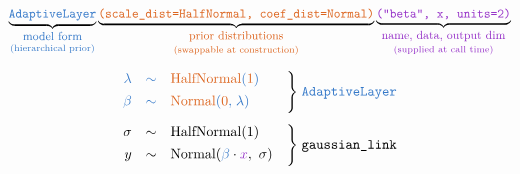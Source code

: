 \documentclass[11pt]{article}
\begin{document}
\[
  \underbrace{%
    \textcolor{modelcol}{\texttt{AdaptiveLayer}}%
  }_{\substack{\textcolor{modelcol}{\text{\small model form}}\\[2pt]
               \textcolor{modelcol}{\text{\scriptsize (hierarchical prior)}}}}
  \underbrace{%
    \textcolor{distcol}{%
      \texttt{(scale\_dist{=}HalfNormal,\ coef\_dist{=}Normal)}%
    }%
  }_{\substack{\textcolor{distcol}{\text{\small prior distributions}}\\[2pt]
               \textcolor{distcol}{\text{\scriptsize (swappable at construction)}}}}
  \underbrace{%
    \textcolor{argscol}{%
      \texttt{("beta",\ x,\ units{=}2)}%
    }%
  }_{\substack{\textcolor{argscol}{\text{\small name,\ data,\ output dim}}\\[2pt]
               \textcolor{argscol}{\text{\scriptsize (supplied at call time)}}}}
\]

\bigskip

\[
  \begin{array}{rcl@{\quad}l}
    \textcolor{modelcol}{\lambda}
      &\textcolor{modelcol}{\sim}& \textcolor{distcol}{\mathrm{HalfNormal}}\textcolor{modelcol}{(}\textcolor{distcol}{1}\textcolor{modelcol}{)}
      & \multirow{2}{*}{$\Bigg\}\;\textcolor{modelcol}{\texttt{AdaptiveLayer}}$} \\[4pt]
    \textcolor{modelcol}{\beta}
      &\textcolor{modelcol}{\sim}& \textcolor{distcol}{\mathrm{Normal}}\textcolor{modelcol}{(}\textcolor{distcol}{0}\textcolor{modelcol}{,\;}\textcolor{modelcol}{\lambda}\textcolor{modelcol}{)}
      & \\[10pt]
    \sigma
      &\sim& \mathrm{HalfNormal}(1)
      & \multirow{2}{*}{$\Bigg\}\;\texttt{gaussian\_link}$} \\[4pt]
    y
      &\sim& \mathrm{Normal}(\textcolor{modelcol}{\beta} \cdot \textcolor{argscol}{x},\ \sigma)
      &
  \end{array}
\]
\end{document}

